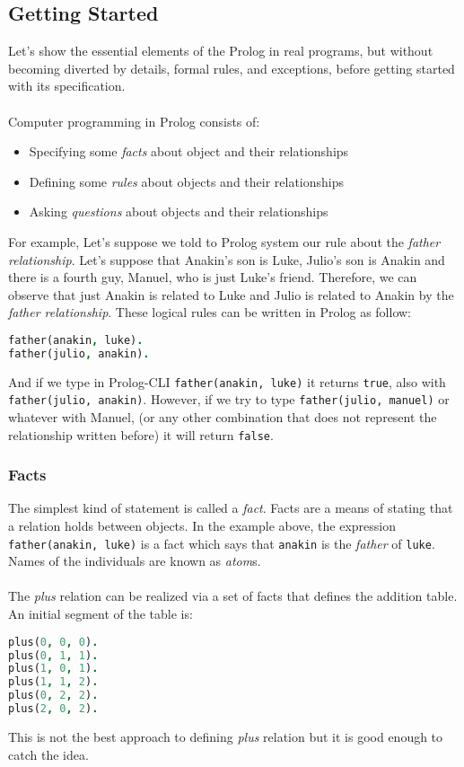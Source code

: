 \documentclass{report}
\theoremstyle{definition}
\theoremstyle{definition}
\newcommand{\ttt}[1]{\texttt{#1}}
\begin{document}
\subsection{Getting Started}
Let's show the essential elements of the Prolog in real programs, but without becoming diverted by details, formal rules, and exceptions, before getting started with its specification.\\\\
Computer programming in Prolog consists of:
\begin{itemize}
	\item Specifying some \textit{facts} about object and their relationships
	\item Defining some \textit{rules} about objects and their relationships
	\item Asking \textit{questions} about objects and their relationships
\end{itemize}

For example, Let's suppose we told to Prolog system our rule about the \textit{father relationship}. Let's suppose that Anakin's son is Luke, Julio's son is Anakin and there is a fourth guy, Manuel, who is just Luke's friend. Therefore, we can observe that just Anakin is related to Luke and Julio is related to Anakin by the \textit{father relationship}. These logical rules can be written in Prolog as follow:
\begin{lstlisting}[language=Prolog, caption=Father Relationship]
father(anakin, luke).
father(julio, anakin).
\end{lstlisting}
And if we type in Prolog-CLI \ttt{father(anakin, luke)} it returns \ttt{true}, also with \ttt{father(julio, anakin)}. However, if we try to type \ttt{father(julio, manuel)} or whatever with Manuel, (or any other combination that does not represent the relationship written before) it will return \ttt{false}.
\subsubsection{Facts}
The simplest kind of statement is called a \textit{fact}. Facts are a means of stating that a relation holds between objects. In the example above, the expression \ttt{father(anakin, luke)} is a fact which says that \ttt{anakin} is the \textit{father} of \ttt{luke}. Names of the individuals are known as \textit{atom}s.\\\\
The \textit{plus} relation can be realized via a set of facts that defines the addition table. An initial segment of the table is:
\begin{lstlisting}[language=Prolog, caption=Plus Relationship]
plus(0, 0, 0).
plus(0, 1, 1).
plus(1, 0, 1).
plus(1, 1, 2).
plus(0, 2, 2).
plus(2, 0, 2).
\end{lstlisting}
This is not the best approach to defining \textit{plus} relation but it is good enough to catch the idea.
\end{document}
